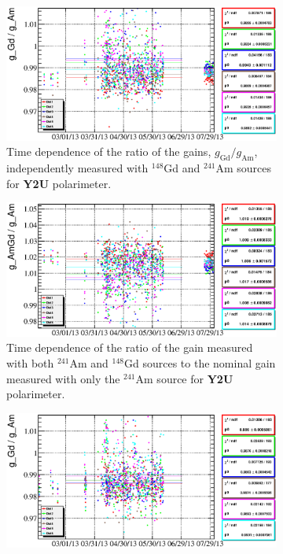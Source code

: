 \documentclass[a4paper,12pt]{article}
\newcommand\americium{${}^{241}$Am}
\newcommand\gadolinium{${}^{148}$Gd}
\begin{document}
\newcommand\gainrealationslabel{Comparison of the effective detector gains
calculated with either one or both $\alpha$-sources for the polarimeters
equipped with two alpha sources. Colors represent individual detectors.}
\begin{figure}
%
\begin{subfigure}[t]{0.49\textwidth}
\includegraphics[width=\textwidth]{gfx/run13_alpha_study/Y2U/c_chGdGain_over_AmGain_by_day_Y2U.eps}
\caption{Time dependence of the ratio of the gains, $g_\text{Gd}/g_\text{Am}$,
independently measured with \gadolinium{} and \americium{} sources for
\textbf{Y2U} polarimeter.}
\end{subfigure}
%
\hfill
%
\begin{subfigure}[t]{0.49\textwidth}
\includegraphics[width=\textwidth]{gfx/run13_alpha_study/Y2U/c_chAmGdGain_over_AmGain_by_day_Y2U.eps}
\caption{Time dependence of the ratio of the gain measured with both \americium{} and
\gadolinium{} sources to the nominal gain measured with only the \americium{}
source for \textbf{Y2U} polarimeter.}
\end{subfigure}
%
\begin{subfigure}[t]{0.49\textwidth}
\includegraphics[width=\textwidth]{gfx/run13_alpha_study/B2D/c_chGdGain_over_AmGain_by_day_B2D.eps}

\end{subfigure}
\end{figure}
\end{document}
